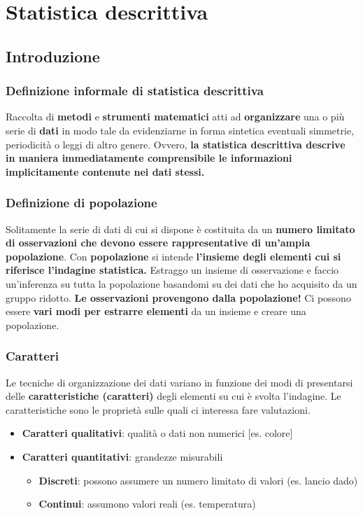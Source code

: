 \chapter[Statistica descrittiva]{Statistica descrittiva}
\section{Introduzione}
\subsection{Definizione informale di statistica descrittiva}
Raccolta di \textbf{metodi} e \textbf{strumenti matematici} atti ad \textbf{organizzare }una o più serie di \textbf{dati }in modo tale da evidenziarne in forma sintetica eventuali simmetrie, periodicità o leggi di altro genere.
Ovvero, \textbf{la statistica descrittiva descrive in maniera immediatamente comprensibile le informazioni implicitamente contenute nei dati stessi.}

\subsection{Definizione di popolazione}
Solitamente la serie di dati di cui si dispone è costituita da un \textbf{numero limitato di osservazioni che devono essere rappresentative di un'ampia popolazione}.
Con \textbf{popolazione }si intende \textbf{l'insieme degli elementi cui si riferisce l'indagine statistica.}
\newline
Estraggo un insieme di osservazione e faccio un'inferenza su tutta la popolazione basandomi su dei dati che ho acquisito da un gruppo ridotto. \newline
\textbf{Le osservazioni provengono dalla popolazione!}
\newline
Ci possono essere \textbf{vari modi per estrarre elementi} da un insieme e creare una popolazione.

\subsection{Caratteri}
Le tecniche di organizzazione dei dati variano in funzione dei modi di presentarsi delle \textbf{caratteristiche (caratteri)} degli elementi su cui è svolta l'indagine.
Le caratteristiche sono le proprietà sulle quali ci interessa fare valutazioni.
\begin{itemize}
	\item \textbf{Caratteri qualitativi}: qualità o dati non numerici [es. colore]
	\item \textbf{Caratteri quantitativi}: grandezze misurabili
	\begin{itemize}
		\item \textbf{Discreti}: possono assumere un numero limitato di valori (es. lancio dado)
		\item \textbf	 {Continui}: assumono valori reali (es. temperatura)
 	\end{itemize}
\end{itemize}

